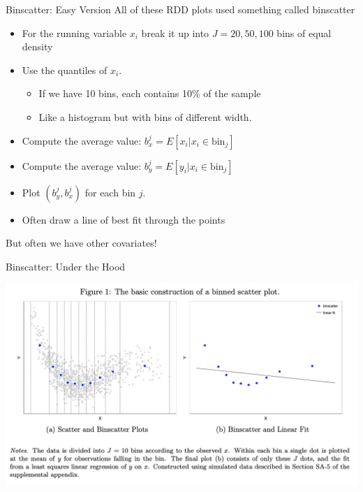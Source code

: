 \documentclass[xcolor=pdftex,dvipsnames,table,mathserif,aspectratio=169]{beamer}
\begin{document}
\begin{frame}{Binscatter: Easy Version}
All of these RDD plots used something called \alert{binscatter}
\begin{itemize}
\item For the running variable $x_i$ break it up into $J=20,50,100$ bins of equal \alert{density}
\item Use the \alert{quantiles} of $x_i$.
\begin{itemize}
\item If we have 10 bins, each contains 10\% of the sample
\item Like a histogram but with \alert{bins of different width}.
\end{itemize}
\item Compute the average value:  $b_x^j=E[x_i | x_i \in \text{bin}_j]$
\item Compute the average value:  $b_y^j=E[y_i | x_i \in \text{bin}_j]$
\item Plot $(b_y^j,b_x^j)$ for each bin $j$.
\item Often draw a line of best fit through the points
\end{itemize}
But often we have other covariates!
\end{frame}


\begin{frame}{Binscatter: Under the Hood}
\begin{center}
\includegraphics[height=0.9\textheight]{./resources/bs2.png}
\end{center}
\end{frame}
\end{document}
